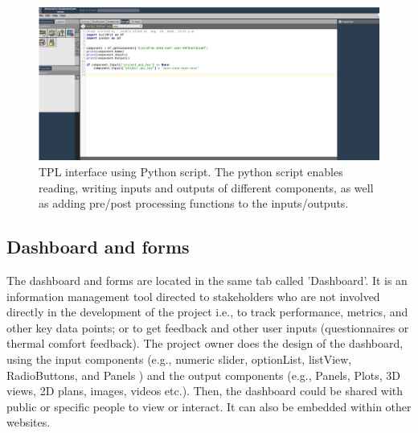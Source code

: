 \documentclass{scsSimAUDPaperFormat}
\begin{document}
\begin{figure}[h]
\centering
\includegraphics[width=\linewidth]{imgs/tpl_interface.png}
\caption{TPL interface using Python script. The python script enables reading, writing inputs and outputs of different components, as well as adding pre/post processing functions to the inputs/outputs.}
\label{fig:tpl_interface}
\end{figure}
\subsection{Dashboard and forms}

\label{sec:applicationlayer}
The dashboard and forms are located in the same tab called 'Dashboard'. It is an information management tool directed to stakeholders who are not involved directly in the development of the project i.e., to track performance, metrics, and other key data points; or to get feedback and other user inputs (questionnaires or thermal comfort feedback). The project owner does the design of the dashboard, using the input components (e.g., numeric slider, optionList, listView, RadioButtons, and  Panels ) and the output components (e.g., Panels, Plots, 3D views, 2D plans, images, videos etc.). Then, the dashboard could be shared with public or specific people to view or interact. It can also be embedded within other websites.
\end{document}
